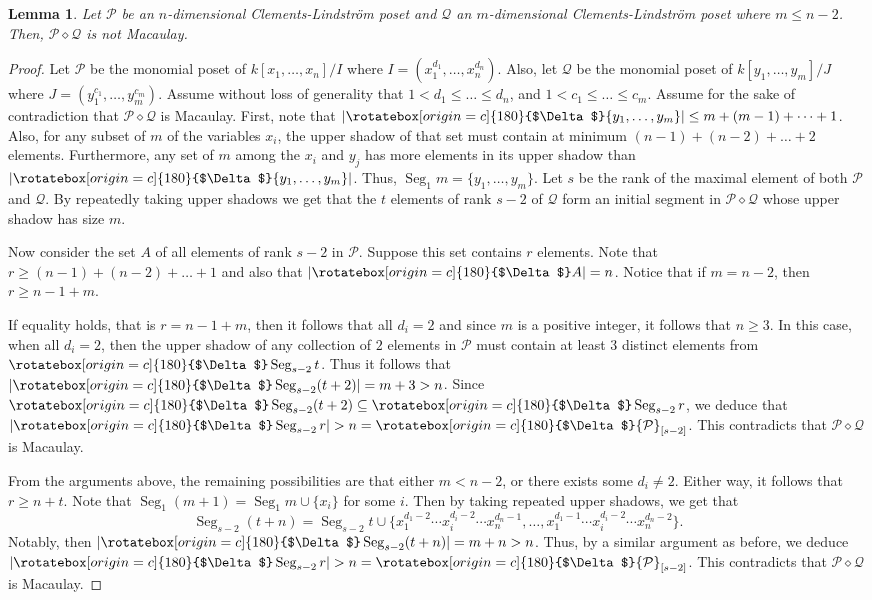 \documentclass[11pt, reqno]{amsart}
\newcommand{\Q}{{\mathcal Q}}
\renewcommand{\P}{{\mathcal P}}
\newcommand{\uSdw}{\rotatebox[origin=c]{180}{$\Delta$}}
\def\Seg{\operatorname{Seg}}
\theoremstyle{plain} %
\newtheorem{lem}[thm]{Lemma}
\theoremstyle{definition}
\theoremstyle{remark}
\numberwithin{equation}{section}  %
\begin{document}
\begin{lem}\label{lem:diff by more than one dim not mac}
    Let $\P$ be an $n$-dimensional Clements-Lindstr\"om poset %
    and $\Q$ an $m$-dimensional Clements-Lindstr\"om poset where $m \leq n - 2$. %
     Then, $\P \diamond \Q$ is not Macaulay. 
\end{lem}
\begin{proof}
Let $\P$ be the monomial poset of  $k[x_1,\dots,x_n]/I$ where $I = (x_1^{d_1},\dots,x_n^{d_n})$. Also, let $\Q$ be the monomial poset of   $k[y_1,\dots,y_m]/J$ where $J = (y_1^{c_1},\dots,y_m^{c_m})$. Assume without loss of generality that $1< d_1 \leq \dots \leq d_n$, and $1< c_1 \leq \dots \leq c_m$. Assume for the sake of contradiction that $\P \diamond \Q$ is Macaulay. First, note that $|\uSdw\{y_1,\dots,y_m\}| \leq m +(m - 1) + \dots + 1$. Also, for any subset of $m$ of the variables $x_i$, the upper shadow of that set must contain at minimum $(n- 1) + (n - 2) + \dots + 2$ elements. Furthermore, any set of $m$ among the $x_i$ and $y_j$ has more elements in its upper shadow than $|\uSdw\{y_1,\dots,y_m\}|$. Thus, $\Seg_1 m = \{y_1,\dots,y_m\}$. Let $s$ be the rank of the maximal element of both $\P$ and $\Q$. By repeatedly taking upper shadows we get that the $t$ elements of rank $s-2$ of $\Q$ form an initial segment  in $\P\diamond \Q$ whose upper shadow has size $m$. %
    
Now consider the set $A$ of all elements of rank $s-2$ in $\P$. Suppose this set contains $r$ elements. Note that $r \geq (n-1) + (n-2) + \dots + 1$ and  also that $|\uSdw A| = n$. Notice that if $m = n - 2$, then $r\geq n-1+m$. 
    
If equality holds, that is $r= n-1+m$, then it follows that all $d_i = 2$ and since $m$ is a positive integer, it follows that $n \geq 3$. In this case, when all $d_i = 2$, then the upper shadow of any collection of $2$ elements in $\P$ must contain at least $3$ distinct elements  from $\uSdw \Seg_{s-2} t$. Thus it follows that $|\uSdw \Seg_{s-2} (t+2)| = m + 3 > n$. Since $\uSdw \Seg_{s-2}( t + 2) \subseteq \uSdw \Seg_{s-2} r$, we deduce that $|\uSdw \Seg_{s-2} r| > n=\uSdw \P_{[s-2]}$. This contradicts that $\P \diamond \Q$ is Macaulay. 
    
From the arguments above, the remaining possibilities are that either $m < n - 2$, or there exists some $d_i \neq 2$. Either way, it follows that $r\geq n+t$. Note that $\Seg_1 (m+1) = \Seg_1 m \cup \{x_i\}$ for some $i$. Then by taking repeated upper shadows, we get that 
\begin{equation*}
\Seg_{s-2} (t + n) = \Seg_{s-2} t \cup \{x_1^{d_1-2}\cdots x_i^{d_i-2}\cdots x_n^{d_n-1}, \ldots, x_1^{d_1-1}\cdots x_i^{d_i-2}\cdots x_n^{d_n-2}\}.
\end{equation*}
Notably, then $|\uSdw \Seg_{s-2} (t + n)| = m + n > n$. Thus, by a similar argument as before, we deduce $|\uSdw \Seg_{s-2} r| > n=\uSdw \P_{[s-2]}$. This contradicts that $\P \diamond \Q$ is Macaulay.
\end{proof}
\end{document}
